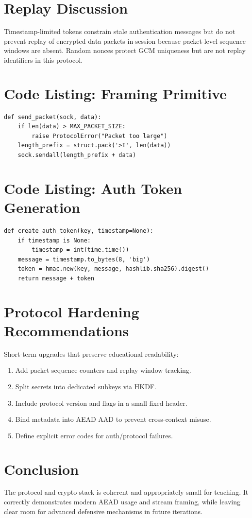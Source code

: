 \section{Replay Discussion}
Timestamp-limited tokens constrain stale authentication messages but do not prevent replay of encrypted data packets in-session because packet-level sequence windows are absent. Random nonces protect GCM uniqueness but are not replay identifiers in this protocol.

\section{Code Listing: Framing Primitive}
\begin{lstlisting}[style=vpnpython,caption={Length-prefix send pattern from protocol module}]
def send_packet(sock, data):
    if len(data) > MAX_PACKET_SIZE:
        raise ProtocolError("Packet too large")
    length_prefix = struct.pack('>I', len(data))
    sock.sendall(length_prefix + data)
\end{lstlisting}

\section{Code Listing: Auth Token Generation}
\begin{lstlisting}[style=vpnpython,caption={Timestamped HMAC token generation pattern}]
def create_auth_token(key, timestamp=None):
    if timestamp is None:
        timestamp = int(time.time())
    message = timestamp.to_bytes(8, 'big')
    token = hmac.new(key, message, hashlib.sha256).digest()
    return message + token
\end{lstlisting}

\section{Protocol Hardening Recommendations}
Short-term upgrades that preserve educational readability:
\begin{enumerate}[leftmargin=2em]
\item Add packet sequence counters and replay window tracking.
\item Split secrets into dedicated subkeys via HKDF.
\item Include protocol version and flags in a small fixed header.
\item Bind metadata into AEAD AAD to prevent cross-context misuse.
\item Define explicit error codes for auth/protocol failures.
\end{enumerate}

\section{Conclusion}
The protocol and crypto stack is coherent and appropriately small for teaching. It correctly demonstrates modern AEAD usage and stream framing, while leaving clear room for advanced defensive mechanisms in future iterations.
